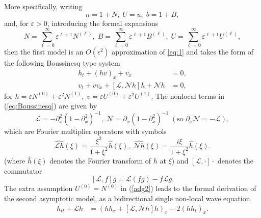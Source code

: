 \documentclass[final,11pt,a4paper,reqno]{amsart}
\theoremstyle{definition}
\begin{document}
More specifically, writing
\begin{equation}\label{adg1}
n=1+N,\;U=u,\; b=1+B,
\end{equation}
and, for $\varepsilon>0$, introducing the formal expansions
\begin{equation}\label{adg2}
N=\sum_{\ell=0}^\infty \varepsilon^{\ell+1} N^{(\ell)},\;B=\sum_{\ell=0}^\infty \varepsilon^{\ell+1} B^{(\ell)},\;U=\sum_{\ell=0}^\infty \varepsilon^{\ell+1} U^{(\ell)},
\end{equation}
then the first model is an $O(\epsilon^{2})$ approximation of \eqref{eq:1} and takes the form of 
the following Boussinesq type system 
\begin{subequations}\label{eq:Boussinesq}
\begin{align}
h_t+(hv)_x+v_x&=0,\\
v_t+vv_x+\left[\mathscr{L},\mathscr{N}h\right]h+\mathscr{N}h&=0,
\end{align}
\end{subequations}
for $h=\varepsilon N^{(0)}+\varepsilon^2 N^{(1)},\;v=\varepsilon U^{(0)}+\varepsilon^2 U^{(1)}$. The nonlocal terms in (\ref{eq:Boussinesq}) are given by
\begin{equation}\label{adg3}
\mathscr{L}=-\partial_x^2(1-\partial_x^2)^{-1},\;
\mathscr{N}=\partial_x(1-\partial_x^2)^{-1}\;(\text{so }\partial_x\mathscr{N}=-\mathscr{L}),
\end{equation}
which are Fourier multiplier operators with symbols
\begin{equation}\label{adg4}
\widehat{\mathscr{L}h}(\xi)=\frac{\xi^2}{1+\xi^2}\hat{h}(\xi),
\; \widehat{\mathscr{N}h}(\xi)=\frac{i\xi}{1+\xi^2}\hat{h}(\xi).
\end{equation}
(where $\widehat{h}(\xi)$ denotes the Fourier transform of $h$ at $\xi$) and $\left[\mathscr{L},\cdot\right]\cdot$ denotes the commutator
\begin{equation}\label{adg4b}
\left[\mathscr{L},f\right]g=\mathscr{L}(fg)-f\mathscr{L}g.
\end{equation}
The extra assumption $U^{(0)}=N^{(0)}$ in (\ref{adg2}) leads to the formal derivation of the second asymptotic model, as a bidirectional single non-local wave equation
\begin{align}\label{wave}
h_{tt}+\mathscr{L}h&=\left(hh_x+\left[\mathscr{L},\mathscr{N}h\right]h\right)_x-2\left(hh_t\right)_x.
\end{align}
\end{document}
